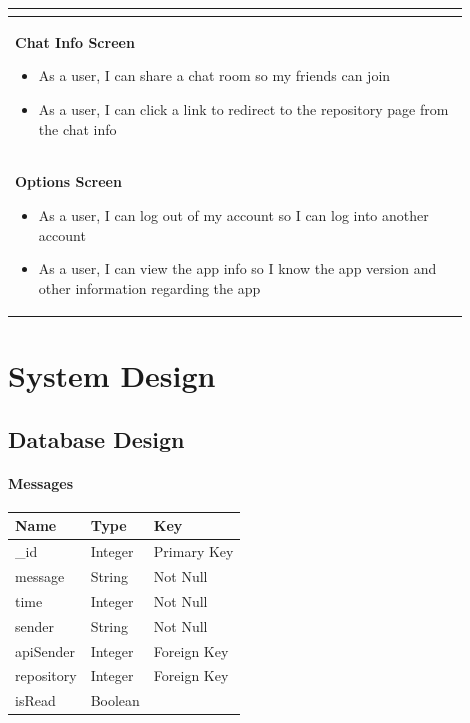 \documentclass{report}
\begin{document}
\begin{center}
\begin{tabular}{ | p{0.9\linewidth} |}
\begin{itemize}
                            \end{itemize} \\
        \hline
        \textbf{Chat Info Screen}\begin{itemize}
                                     \item As a user, I can share a chat room so my friends can join
                                     \item As a user, I can click a link to redirect to the repository page from the chat info
                                 \end{itemize}                                      \\
        \hline
        \textbf{Options Screen}\begin{itemize}
                                   \item As a user, I can log out of my account so I can log into another account
                                   \item As a user, I can view the app info so I know the app version and other information regarding the app

                               \end{itemize}                       \\
        \hline
    \end{tabular}
\end{center}

\chapter{System Design}

\section{Database Design}

\subsubsection{Messages}
\begin{tabular}{| l | l | l |}
    \hline
    \textbf{Name} & \textbf{Type} & \textbf{Key} \\
    \hline
    \hline
    \_id          & Integer       & Primary Key  \\
    \hline
    message       & String        & Not Null     \\
    \hline
    time      & Integer       & Not Null     \\
    \hline
    sender        & String        & Not Null     \\
    \hline
    apiSender     & Integer       & Foreign Key  \\
    \hline
    repository    & Integer       & Foreign Key  \\
    \hline
    isRead        & Boolean       &              \\
    \hline
\end{tabular}
\end{document}
